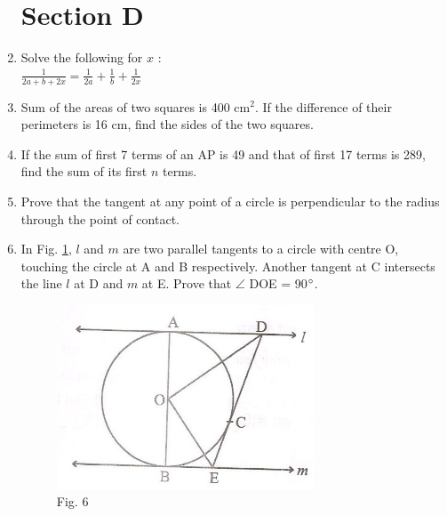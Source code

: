 \documentclass[journal,12pt,twocolumn]{IEEEtran}
\renewcommand\thesection{\arabic{section}}
\begin{document}
\begin{enumerate}[label=\thesection.\arabic*.,ref=\thesection.\theenumi]
\section{Section D}
\item Solve the following for $x$ : \\
$\frac{1}{2a+b+2x}=\frac{1}{2a}+\frac{1}{b}+\frac{1}{2x}$ \\
\item Sum of the areas of two squares is 400 cm$^2$. If the difference of their perimeters is 16 cm, find the sides of the two squares.
\item If the sum of first 7 terms of an AP is 49 and that of first 17 terms is 289, find the sum of its first $n$ terms. 
\item Prove that the tangent at any point of a circle is perpendicular to the radius through the point of contact.
\item In Fig. \ref{fig6}, $l$ and $m$ are two parallel tangents to a circle with centre O, touching the circle at A and B respectively. Another tangent at C intersects the line $l$ at D and $m$ at E. Prove that $\angle$ DOE = 90$\degree$.\\

	\begin{figure}
\includegraphics[width=\columnwidth]{6.png}
\caption{Fig. 6}
\label{fig6}
 \end{figure}


\end{enumerate}
\end{document}
